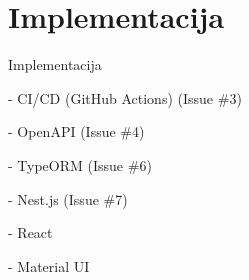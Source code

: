 \chapter{Implementacija}\label{ch:impl}

Implementacija

- CI/CD (GitHub Actions) (Issue \#3)

- OpenAPI (Issue \#4)

- TypeORM (Issue \#6)

- Nest.js (Issue \#7)

- React

- Material UI
